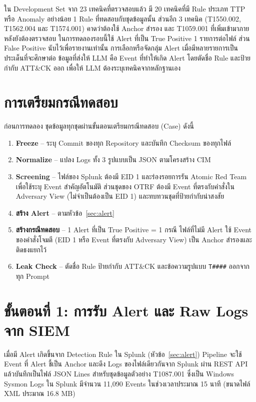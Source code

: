 ใน Development Set จาก 23 เทคนิคที่ตรวจสอบแล้ว มี 20 เทคนิคที่มี Rule ประเภท TTP หรือ Anomaly อย่างน้อย 1 Rule
ที่ทดสอบกับชุดข้อมูลนั้น ส่วนอีก 3 เทคนิค (T1550.002, T1562.004 และ T1574.001) คาดว่าต้องใช้ Anchor สำรอง
และ T1059.001 ที่เพิ่มเข้ามาภายหลังยังต้องตรวจสอบ
ในการทดลองรอบนี้ใช้ Alert ที่เป็น True Positive 1 รายการต่อไฟล์ ส่วน False Positive นับไว้เพื่อรายงานเท่านั้น
การเลือกหรือจัดกลุ่ม Alert เมื่อมีหลายรายการเป็นประเด็นที่จะศึกษาต่อ
ข้อมูลที่ส่งให้ LLM คือ Event ที่ทำให้เกิด Alert โดยตัดชื่อ Rule และป้ายกำกับ ATT\&CK ออก
เพื่อให้ LLM ต้องระบุเทคนิคจากหลักฐานเอง

\section{การเตรียมกรณีทดสอบ}
\label{sec:case-prep}

ก่อนการทดลอง ชุดข้อมูลทุกชุดผ่านขั้นตอนเตรียมกรณีทดสอบ (Case) ดังนี้
\begin{enumerate}
  \item \textbf{Freeze} -- ระบุ Commit ของทุก Repository และบันทึก Checksum ของทุกไฟล์
  \item \textbf{Normalize} -- แปลง Logs ทั้ง 3 รูปแบบเป็น JSON ตามโครงสร้าง CIM
  \item \textbf{Screening} -- ไฟล์ของ Splunk ต้องมี EID 1 และร่องรอยการรัน Atomic Red Team เพื่อใช้ระบุ Event สำคัญอัตโนมัติ
        ส่วนชุดของ OTRF ต้องมี Event ที่ตรงกับคำสั่งใน Adversary View (ไม่จำเป็นต้องเป็น EID 1)
        และทบทวนชุดที่ป้ายกำกับน่าสงสัย
  \item \textbf{สร้าง Alert} -- ตามหัวข้อ~\ref{sec:alert}
  \item \textbf{สร้างกรณีทดสอบ} -- 1 Alert ที่เป็น True Positive = 1 กรณี
        ไฟล์ที่ไม่มี Alert ใช้ Event ของคำสั่งโจมตี (EID 1 หรือ Event ที่ตรงกับ Adversary View) เป็น Anchor สำรองและติดธงแยกไว้
  \item \textbf{Leak Check} -- ตัดชื่อ Rule ป้ายกำกับ ATT\&CK และข้อความรูปแบบ \texttt{T\#\#\#\#} ออกจากทุก Prompt
\end{enumerate}

\section{ขั้นตอนที่ 1: การรับ Alert และ Raw Logs จาก SIEM}

เมื่อมี Alert เกิดขึ้นจาก Detection Rule ใน Splunk (หัวข้อ~\ref{sec:alert})
Pipeline จะใช้ Event ที่ Alert ชี้เป็น Anchor และดึง Logs ของไฟล์เดียวกันจาก Splunk ผ่าน REST API
แล้วบันทึกเป็นไฟล์ JSON Lines
สำหรับชุดข้อมูลตัวอย่าง T1087.001 ซึ่งเป็น Windows Sysmon Logs ใน Splunk
มีจำนวน 11,090 Events ในช่วงเวลาประมาณ 15 นาที (ขนาดไฟล์ XML ประมาณ 16.8 MB)

